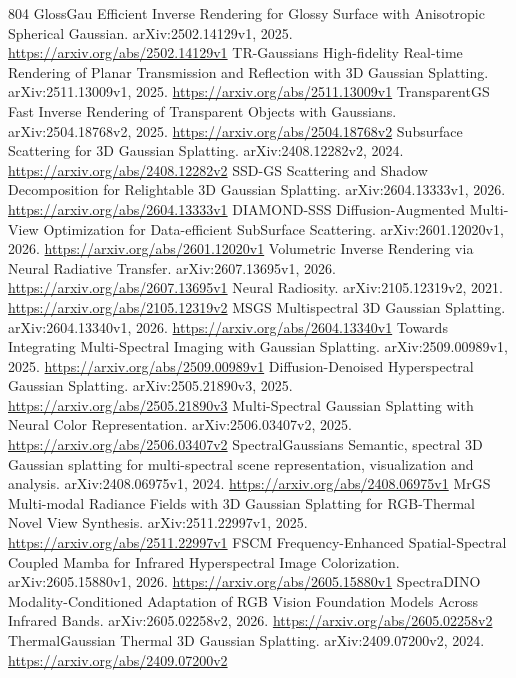 \documentclass[11pt]{article}
\begin{document}
\begin{thebibliography}{804}
 GlossGau Efficient Inverse Rendering for Glossy Surface with Anisotropic Spherical Gaussian. arXiv:2502.14129v1, 2025. \url{https://arxiv.org/abs/2502.14129v1}
 TR-Gaussians High-fidelity Real-time Rendering of Planar Transmission and Reflection with 3D Gaussian Splatting. arXiv:2511.13009v1, 2025. \url{https://arxiv.org/abs/2511.13009v1}
 TransparentGS Fast Inverse Rendering of Transparent Objects with Gaussians. arXiv:2504.18768v2, 2025. \url{https://arxiv.org/abs/2504.18768v2}
 Subsurface Scattering for 3D Gaussian Splatting. arXiv:2408.12282v2, 2024. \url{https://arxiv.org/abs/2408.12282v2}
 SSD-GS Scattering and Shadow Decomposition for Relightable 3D Gaussian Splatting. arXiv:2604.13333v1, 2026. \url{https://arxiv.org/abs/2604.13333v1}
 DIAMOND-SSS Diffusion-Augmented Multi-View Optimization for Data-efficient SubSurface Scattering. arXiv:2601.12020v1, 2026. \url{https://arxiv.org/abs/2601.12020v1}
 Volumetric Inverse Rendering via Neural Radiative Transfer. arXiv:2607.13695v1, 2026. \url{https://arxiv.org/abs/2607.13695v1}
 Neural Radiosity. arXiv:2105.12319v2, 2021. \url{https://arxiv.org/abs/2105.12319v2}
 MSGS Multispectral 3D Gaussian Splatting. arXiv:2604.13340v1, 2026. \url{https://arxiv.org/abs/2604.13340v1}
 Towards Integrating Multi-Spectral Imaging with Gaussian Splatting. arXiv:2509.00989v1, 2025. \url{https://arxiv.org/abs/2509.00989v1}
 Diffusion-Denoised Hyperspectral Gaussian Splatting. arXiv:2505.21890v3, 2025. \url{https://arxiv.org/abs/2505.21890v3}
 Multi-Spectral Gaussian Splatting with Neural Color Representation. arXiv:2506.03407v2, 2025. \url{https://arxiv.org/abs/2506.03407v2}
 SpectralGaussians Semantic, spectral 3D Gaussian splatting for multi-spectral scene representation, visualization and analysis. arXiv:2408.06975v1, 2024. \url{https://arxiv.org/abs/2408.06975v1}
 MrGS Multi-modal Radiance Fields with 3D Gaussian Splatting for RGB-Thermal Novel View Synthesis. arXiv:2511.22997v1, 2025. \url{https://arxiv.org/abs/2511.22997v1}
 FSCM Frequency-Enhanced Spatial-Spectral Coupled Mamba for Infrared Hyperspectral Image Colorization. arXiv:2605.15880v1, 2026. \url{https://arxiv.org/abs/2605.15880v1}
 SpectraDINO Modality-Conditioned Adaptation of RGB Vision Foundation Models Across Infrared Bands. arXiv:2605.02258v2, 2026. \url{https://arxiv.org/abs/2605.02258v2}
 ThermalGaussian Thermal 3D Gaussian Splatting. arXiv:2409.07200v2, 2024. \url{https://arxiv.org/abs/2409.07200v2}

\end{thebibliography}
\end{document}

